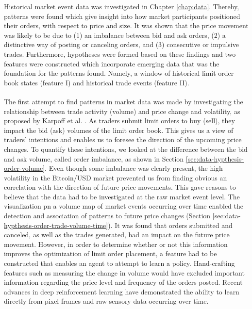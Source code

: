     Historical market event data was investigated in Chapter \ref{chap:data}. 
    Thereby, patterns were found which give insight into how market participants positioned their orders, with respect to price and size. 
    It was shown that the price movement was likely to be due to (1) an imbalance between bid and ask orders, (2) a distinctive way of posting or canceling orders, and (3) consecutive or impulsive trades.
    Furthermore, hypotheses were formed based on these findings and two features were constructed which incorporate emerging data that was the foundation for the patterns found.
    Namely, a window of historical limit order book states (feature I) and historical trade events (feature II).
    \\
    \\
The first attempt to find patterns in market data was made by investigating the relationship between trade activity (volume) and price change and volatility, as proposed by Karpoff et al. \cite{karpoff1987relation}.  
As traders submit limit orders to buy (sell), they impact the bid (ask) volumes of the  limit order book. This gives us a view of traders’ intentions and enables us to foresee the direction of the upcoming price changes.
To quantify these intentions, we looked at the difference between the bid and ask volume, called order imbalance, as shown in Section \ref{sec:data-hypthesis-order-volume}.
Even though some imbalance was clearly present, the high volatility in the Bitcoin/USD market prevented us from finding obvious an correlation with the direction of future price movements.
This gave reasons to believe that the data had to be investigated at the raw market event level\cite{kane2011analyzing}.
The visualization pn a volume map of market events occurring over time enabled the detection and association of patterns to future price changes (Section \ref{sec:data-hypthesis-order-trade-volume-time}).
It was found that orders submitted and canceled, as well as the trades generated, had an impact on the future price movement.
However, in order to determine whether or not this information improves the optimization of limit order placement, a feature had to be constructed that enables an agent to attempt to learn a policy.
Hand-crafting features such as measuring the change in volume would have excluded important information regarding the price level and frequency of the orders posted.
Recent advances in deep reinforcement learning have demonstrated the ability to learn directly from pixel frames\cite{mnih2013playing} and raw sensory data\cite{mnih2015human} occurring over time.
